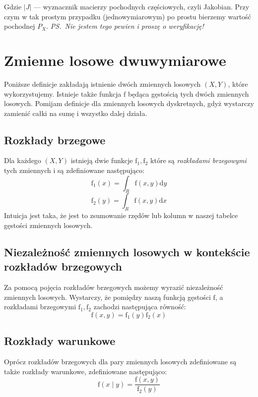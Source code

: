 \documentclass[a4paper,12pt]{article}
\begin{document}
Gdzie $|J|$ --- wyznacznik macierzy pochodnych częściowych, czyli Jakobian. Przy czym w tak prostym przypadku (jednowymiarowym) po prostu bierzemy wartość pochodnej $P_X$. \emph{PS.\ Nie jestem tego pewien i proszę o weryfikację!}

\section{Zmienne losowe dwuwymiarowe}
Poniższe definicje zakładają istnienie dwóch zmiennych losowych $\left(X, Y\right)$, które wykorzystujemy. Istnieje także funkcja $\textrm{f}$ będąca gęstością tych dwóch zmiennych losowych. Pomijam definicje dla zmiennych losowych dyskretnych, gdyż wystarczy zamienić całki na sumę i wszystko dalej działa.

\subsection{Rozkłady brzegowe}
Dla każdego $\left(X, Y\right)$ istnieją dwie funkcje $\textrm{f}_1, \textrm{f}_2$ które są \emph{rozkładami brzegowymi} tych zmiennych i są zdefiniowane następująco:
\begin{equation}
\textrm{f}_1\left(x\right) = \int_{{R}} \textrm{f}\left(x,y\right)\textrm{d}y
\end{equation}
\begin{equation}
\textrm{f}_2\left(y\right) = \int_{{R}} \textrm{f}\left(x,y\right)\textrm{d}x
\end{equation}
Intuicja jest taka, że jest to zsumowanie rzędów lub kolumn w naszej tabelce gęstości zmiennych losowych.

\subsection{Niezależność zmiennych losowych w kontekście rozkładów brzegowych}
Za pomocą pojęcia rozkładów brzegowych możemy wyrazić niezależność zmiennych losowych. Wystarczy, że pomiędzy naszą funkcją gęstości $\textrm{f}$, a rozkładami brzegowymi $\textrm{f}_1, \textrm{f}_2$ zachodzi następująca równość:
\begin{equation}
\textrm{f}\left(x, y\right) = \textrm{f}_1\left(y\right)\textrm{f}_2\left(x\right)
\end{equation}

\subsection{Rozkłady warunkowe}
Oprócz rozkładów brzegowych dla pary zmiennych losowych zdefiniowane są także rozkłady warunkowe, zdefiniowane następująco:
\begin{equation}
\textrm{f}\left(x \mid y\right) = \frac{\textrm{f}\left(x, y\right)}{\textrm{f}_2\left(y\right)}
\end{equation}
\end{document}
